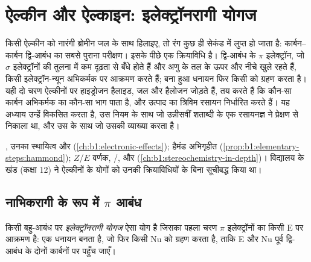 \chapter{ऐल्कीन और ऐल्काइन: इलेक्ट्रॉनरागी योगज}\label{ch:b1:electrophilic-additions}

किसी ऐल्कीन को नारंगी ब्रोमीन जल के साथ हिलाइए, तो रंग कुछ ही सेकंड में
लुप्त हो जाता है: कार्बन--कार्बन द्वि-आबंध का सबसे पुराना परीक्षण। इसके पीछे एक
क्रियाविधि है। द्वि-आबंध के $\pi$ इलेक्ट्रॉन, जो
$\sigma$ इलेक्ट्रॉनों की तुलना में कम दृढ़ता से बँधे होते हैं और अणु के तल के ऊपर और नीचे खुले रहते हैं,
किसी इलेक्ट्रॉन-न्यून अभिकर्मक पर आक्रमण करते हैं; बना हुआ धनायन फिर
किसी  को ग्रहण करता है। यही दो चरण ऐल्कीनों पर हाइड्रोजन हैलाइड, जल
और हैलोजन जोड़ते हैं, तय करते हैं कि कौन-सा कार्बन अभिकर्मक का कौन-सा भाग
पाता है, और उत्पाद का त्रिविम रसायन निर्धारित करते हैं। यह अध्याय
उन्हें विकसित करता है, उस नियम के साथ जो उन्नीसवीं शताब्दी के एक रसायनज्ञ ने
प्रेक्षण से निकाला था, और उस  के साथ जो उसकी व्याख्या करता है।

\begin{recall}
, उनका स्थायित्व और  (\cref{ch:b1:electronic-effects});
हैमंड अभिगृहीत (\cref{prop:b1:elementary-steps:hammond}); $Z$/$E$
वर्णक, /,  और 
(\cref{ch:b1:stereochemistry-in-depth})। विद्यालय के खंड (कक्षा 12) ने
ऐल्कीनों के योगों को उनकी क्रियाविधियों के बिना सूचीबद्ध किया था।
\end{recall}

\section{नाभिकरागी के रूप में \texorpdfstring{$\pi$}{पाई} आबंध}

\begin{definition}[इलेक्ट्रॉनरागी योगज]\label{def:b1:electrophilic-additions:electrophilic-addition}
किसी बहु-आबंध पर \emph{इलेक्ट्रॉनरागी योगज}
ऐसा योग है जिसका पहला चरण
$\pi$ इलेक्ट्रॉनों का किसी  E पर आक्रमण है: एक धनायन बनता है, जो फिर
किसी  Nu को ग्रहण करता है, ताकि E और Nu पूर्व द्वि-आबंध के दोनों कार्बनों पर
पहुँच जाएँ।
\end{definition}

